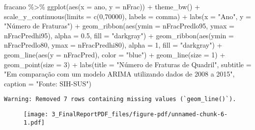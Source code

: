 \documentclass[
  letterpaper,
  DIV=11,
  numbers=noendperiod]{scrartcl}
\newenvironment{Shaded}{\begin{snugshade}}{\end{snugshade}}
\newcommand{\AttributeTok}[1]{\textcolor[rgb]{0.40,0.45,0.13}{#1}}
\newcommand{\DecValTok}[1]{\textcolor[rgb]{0.68,0.00,0.00}{#1}}
\newcommand{\FloatTok}[1]{\textcolor[rgb]{0.68,0.00,0.00}{#1}}
\newcommand{\FunctionTok}[1]{\textcolor[rgb]{0.28,0.35,0.67}{#1}}
\newcommand{\NormalTok}[1]{\textcolor[rgb]{0.00,0.23,0.31}{#1}}
\newcommand{\SpecialCharTok}[1]{\textcolor[rgb]{0.37,0.37,0.37}{#1}}
\newcommand{\StringTok}[1]{\textcolor[rgb]{0.13,0.47,0.30}{#1}}
\begin{document}
\begin{Shaded}
\begin{Highlighting}[]
\NormalTok{fracano }\SpecialCharTok{\%\textgreater{}\%} 
  \FunctionTok{ggplot}\NormalTok{(}\FunctionTok{aes}\NormalTok{(}\AttributeTok{x =}\NormalTok{ ano, }\AttributeTok{y =}\NormalTok{ nFrac)) }\SpecialCharTok{+}
        \FunctionTok{theme\_bw}\NormalTok{() }\SpecialCharTok{+}
        \FunctionTok{scale\_y\_continuous}\NormalTok{(}\AttributeTok{limits =} \FunctionTok{c}\NormalTok{(}\DecValTok{0}\NormalTok{,}\DecValTok{70000}\NormalTok{), }\AttributeTok{labels =}\NormalTok{ comma) }\SpecialCharTok{+}
        \FunctionTok{labs}\NormalTok{(}\AttributeTok{x =} \StringTok{"Ano"}\NormalTok{, }\AttributeTok{y =} \StringTok{"Número de Fraturas"}\NormalTok{) }\SpecialCharTok{+}
        \FunctionTok{geom\_ribbon}\NormalTok{(}\FunctionTok{aes}\NormalTok{(}\AttributeTok{ymin =}\NormalTok{ nFracPredlo95, }\AttributeTok{ymax =}\NormalTok{ nFracPredhi95), }\AttributeTok{alpha =} \FloatTok{0.5}\NormalTok{, }\AttributeTok{fill =} \StringTok{"darkgray"}\NormalTok{) }\SpecialCharTok{+}
        \FunctionTok{geom\_ribbon}\NormalTok{(}\FunctionTok{aes}\NormalTok{(}\AttributeTok{ymin =}\NormalTok{ nFracPredlo80, }\AttributeTok{ymax =}\NormalTok{ nFracPredhi80), }\AttributeTok{alpha =} \DecValTok{1}\NormalTok{, }\AttributeTok{fill =} \StringTok{"darkgray"}\NormalTok{) }\SpecialCharTok{+}
        \FunctionTok{geom\_line}\NormalTok{(}\FunctionTok{aes}\NormalTok{(}\AttributeTok{y =}\NormalTok{ nFracPred), }\AttributeTok{color =} \StringTok{"blue"}\NormalTok{) }\SpecialCharTok{+}
        \FunctionTok{geom\_line}\NormalTok{(}\AttributeTok{size =} \DecValTok{1}\NormalTok{) }\SpecialCharTok{+}
        \FunctionTok{geom\_point}\NormalTok{(}\AttributeTok{size =} \DecValTok{3}\NormalTok{) }\SpecialCharTok{+}
        \FunctionTok{labs}\NormalTok{(}\AttributeTok{title =} \StringTok{"Número de Fraturas de Quadril"}\NormalTok{, }\AttributeTok{subtitle =} \StringTok{"Em comparação com um modelo ARIMA utilizando dados de 2008 a 2015"}\NormalTok{,}
             \AttributeTok{caption =} \StringTok{"Fonte: SIH{-}SUS"}\NormalTok{)}
\end{Highlighting}
\end{Shaded}

\begin{verbatim}
Warning: Removed 7 rows containing missing values (`geom_line()`).
\end{verbatim}

\begin{figure}[H]

{\centering \texttt{[image: 3\_FinalReportPDF\_files/figure-pdf/unnamed-chunk-6-1.pdf]}

}

\end{figure}
\end{document}
